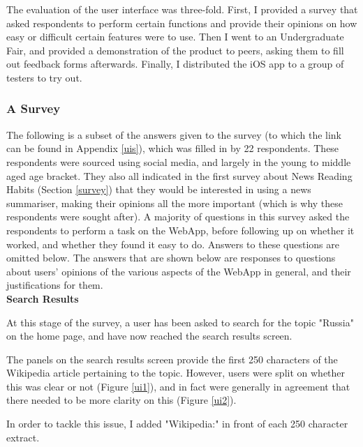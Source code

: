 \documentclass[12pt]{article}
\begin{document}
The evaluation of the user interface was three-fold. First, I provided a survey that asked respondents to perform certain functions and provide their opinions on how easy or difficult certain features were to use. Then I went to an Undergraduate Fair, and provided a demonstration of the product to peers, asking them to fill out feedback forms afterwards. Finally, I distributed the iOS app to a group of testers to try out. 

\subsubsection{A Survey}

\label{uisurvey}

The following is a subset of the answers given to the survey (to which the link can be found in Appendix \ref{uis}), which was filled in by 22 respondents. These respondents were sourced using social media, and largely in the young to middle aged age bracket. They also all indicated in the first survey about News Reading Habits (Section \ref{survey}) that they would be interested in using a news summariser, making their opinions all the more important (which is why these respondents were sought after). A majority of questions in this survey asked the respondents to perform a task on the WebApp, before following up on whether it worked, and whether they found it easy to do. Answers to these questions are omitted below. The answers that are shown below are responses to questions about users' opinions of the various aspects of the WebApp in general, and their justifications for them. \\

\textbf{Search Results}

At this stage of the survey, a user has been asked to search for the topic "Russia" on the home page, and have now reached the search results screen.

The panels on the search results screen provide the first 250 characters of the Wikipedia \cite{wikipedia} article pertaining to the topic. However, users were split on whether this was clear or not (Figure \ref{ui1}), and in fact were generally in agreement that there needed to be more clarity on this (Figure \ref{ui2}). 

In order to tackle this issue, I added "Wikipedia:" in front of each 250 character extract. \\
\end{document}
